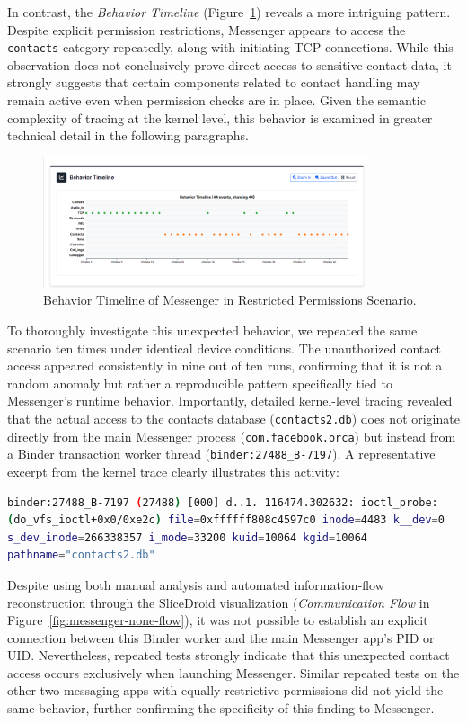 \documentclass[a4paper,12pt]{report}
\begin{document}
In contrast, the \textit{Behavior Timeline} (Figure~\ref{fig:messenger-none-behav}) reveals a more intriguing pattern. Despite explicit permission restrictions, Messenger appears to access the \texttt{contacts} category repeatedly, along with initiating TCP connections. While this observation does not conclusively prove direct access to sensitive contact data, it strongly suggests that certain components related to contact handling may remain active even when permission checks are in place. Given the semantic complexity of tracing at the kernel level, this behavior is examined in greater technical detail in the following paragraphs.
\begin{figure}[H]
\centering
\includegraphics[width=0.85\textwidth]{messenger-none-behav.png}
\caption{Behavior Timeline of Messenger in Restricted Permissions Scenario.}
\label{fig:messenger-none-behav}
\end{figure}

To thoroughly investigate this unexpected behavior, we repeated the same scenario ten times under identical device conditions. The unauthorized contact access appeared consistently in nine out of ten runs, confirming that it is not a random anomaly but rather a reproducible pattern specifically tied to Messenger’s runtime behavior. Importantly, detailed kernel-level tracing revealed that the actual access to the contacts database (\texttt{contacts2.db}) does not originate directly from the main Messenger process (\texttt{com.facebook.orca}) but instead from a Binder transaction worker thread (\texttt{binder:27488\_B-7197}). A representative excerpt from the kernel trace clearly illustrates this activity:

\begin{lstlisting}[language=bash]
binder:27488_B-7197 (27488) [000] d..1. 116474.302632: ioctl_probe:
(do_vfs_ioctl+0x0/0xe2c) file=0xffffff808c4597c0 inode=4483 k__dev=0
s_dev_inode=266338357 i_mode=33200 kuid=10064 kgid=10064
pathname="contacts2.db"
\end{lstlisting}

Despite using both manual analysis and automated information-flow reconstruction through the SliceDroid visualization (\textit{Communication Flow} in Figure~\ref{fig:messenger-none-flow}), it was not possible to establish an explicit connection between this Binder worker and the main Messenger app’s PID or UID. Nevertheless, repeated tests strongly indicate that this unexpected contact access occurs exclusively when launching Messenger. Similar repeated tests on the other two messaging apps with equally restrictive permissions did not yield the same behavior, further confirming the specificity of this finding to Messenger.
\end{document}
